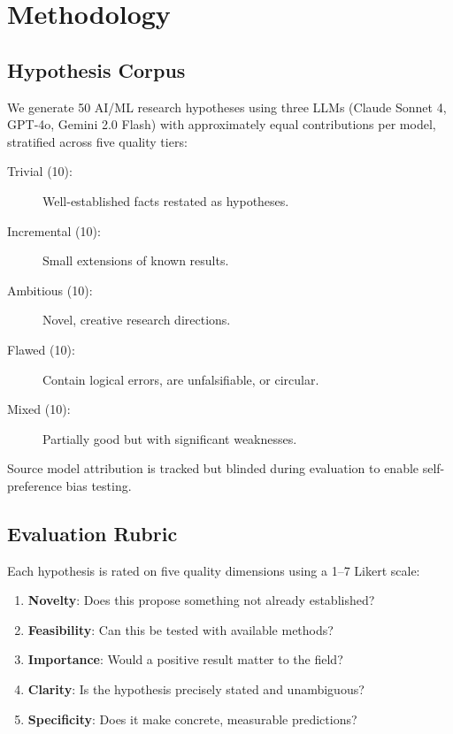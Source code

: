 \documentclass[11pt,a4paper]{article}
\begin{document}
\section{Methodology}
\label{sec:methodology}

\subsection{Hypothesis Corpus}
\label{sec:corpus}

We generate 50 AI/ML research hypotheses using three LLMs (Claude
Sonnet 4, GPT-4o, Gemini 2.0 Flash) with approximately equal
contributions per model, stratified across five quality tiers:

\begin{description}
  \item[Trivial (10):] Well-established facts restated as hypotheses.
  \item[Incremental (10):] Small extensions of known results.
  \item[Ambitious (10):] Novel, creative research directions.
  \item[Flawed (10):] Contain logical errors, are unfalsifiable, or
    circular.
  \item[Mixed (10):] Partially good but with significant weaknesses.
\end{description}

Source model attribution is tracked but blinded during evaluation to enable
self-preference bias testing.

\subsection{Evaluation Rubric}
\label{sec:rubric}

Each hypothesis is rated on five quality dimensions using a 1--7 Likert
scale:

\begin{enumerate}
  \item \textbf{Novelty}: Does this propose something not already
        established?
  \item \textbf{Feasibility}: Can this be tested with available methods?
  \item \textbf{Importance}: Would a positive result matter to the field?
  \item \textbf{Clarity}: Is the hypothesis precisely stated and
        unambiguous?
  \item \textbf{Specificity}: Does it make concrete, measurable
        predictions?
\end{enumerate}
\end{document}

